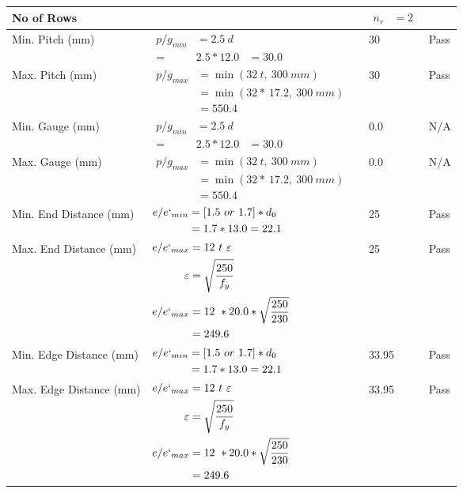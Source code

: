 \documentclass{article}%
\begin{document}
\begin{longtable}{|p{4cm}|p{5cm}|p{5.5cm}|p{1.5cm}|}
\hline%
No of Rows&&$\begin{aligned} n_r &=2 \end{aligned}$&\\%
\hline%
Min. Pitch (mm)&$\begin{aligned}p/g_{min}&= 2.5 ~ d&\\ =&2.5*12.0&=30.0\end{aligned}$&30&Pass\\%
\hline%
Max. Pitch (mm)&$\begin{aligned}p/g_{max} &=\min(32~t,~300~mm)&\\ &=\min(32 *~17.2,~ 300 ~mm)\\&=550.4\end{aligned}$&30&Pass\\%
\hline%
Min. Gauge (mm)&$\begin{aligned}p/g_{min}&= 2.5 ~ d&\\ =&2.5*12.0&=30.0\end{aligned}$&0.0&N/A\\%
\hline%
Max. Gauge (mm)&$\begin{aligned}p/g_{max} &=\min(32~t,~300~mm)&\\ &=\min(32 *~17.2,~ 300 ~mm)\\&=550.4\end{aligned}$&0.0&N/A\\%
\hline%
Min. End Distance (mm)&$\begin{aligned}e/e`_{min} &=[1.5~or~ 1.7] * d_0\\ &=1.7*13.0=22.1 \end{aligned}$&25&Pass\\%
\hline%
Max. End Distance (mm)&$\begin{aligned}e/e`_{max} &= 12~ t~ \varepsilon&\\ \varepsilon &= \sqrt{\frac{250}{f_y}}\\ e/e`_{max}&=12 ~*20.0*\sqrt{\frac{250}{230}}\\ &=249.6\\ \end{aligned}$&25&Pass\\%
\hline%
Min. Edge Distance (mm)&$\begin{aligned}e/e`_{min} &=[1.5~or~ 1.7] * d_0\\ &=1.7*13.0=22.1 \end{aligned}$&33.95&Pass\\%
\hline%
Max. Edge Distance (mm)&$\begin{aligned}e/e`_{max} &= 12~ t~ \varepsilon&\\ \varepsilon &= \sqrt{\frac{250}{f_y}}\\ e/e`_{max}&=12 ~*20.0*\sqrt{\frac{250}{230}}\\ &=249.6\\ \end{aligned}$&33.95&Pass\\%

\end{longtable}
\end{document}

